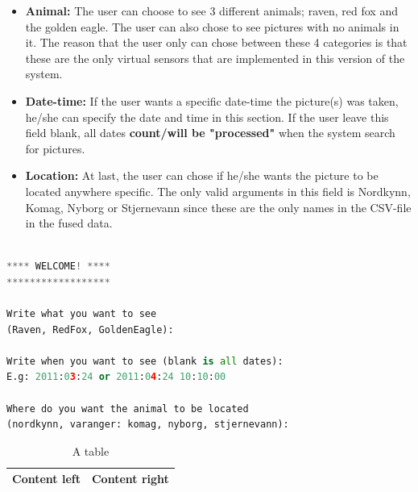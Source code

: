 \documentclass[USenglish]{uit-thesis}
\begin{document}
\begin{itemize}
\item \textbf{Animal:} The user can choose to see 3 different animals; raven, red fox and the golden eagle. The user can also chose to see pictures with no animals in it. The reason that the user only can chose between these 4 categories is that these are the only virtual sensors that are implemented in this version of the system.
\item \textbf{Date-time:} If the user wants a specific date-time the picture(s) was taken, he/she can specify the date and time in this section. If the user leave this field blank, all dates \textbf{count/will be "processed"} when the system search for pictures.
\item \textbf{Location:} At last, the user can chose if he/she wants the picture to be located anywhere specific. The only valid arguments in this field is Nordkynn, Komag, Nyborg or Stjernevann since these are the only names in the CSV-file in the fused data.
\end{itemize}

\begin{lstlisting}[frame=single,caption={Main menu },label={lst:mainmenu}, language=Python]

**** WELCOME! ****
******************

Write what you want to see
(Raven, RedFox, GoldenEagle): 

Write when you want to see (blank is all dates): 
E.g: 2011:03:24 or 2011:04:24 10:10:00

Where do you want the animal to be located
(nordkynn, varanger: komag, nyborg, stjernevann):
\end{lstlisting}


\iffalse 
\begin{table}
\centering
\begin{tabular}{|l|l|}
\hline
Content left & Content right\\
\hline
\end{tabular}
\caption{A table}
\end{table}

\end{document}
